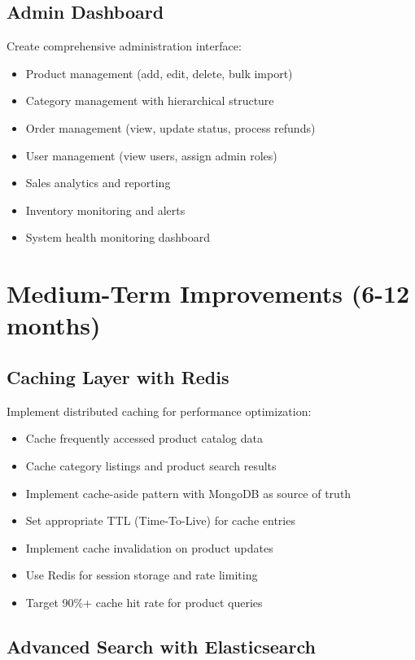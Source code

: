 \subsection{Admin Dashboard}

Create comprehensive administration interface:
\begin{itemize}
    \item Product management (add, edit, delete, bulk import)
    \item Category management with hierarchical structure
    \item Order management (view, update status, process refunds)
    \item User management (view users, assign admin roles)
    \item Sales analytics and reporting
    \item Inventory monitoring and alerts
    \item System health monitoring dashboard
\end{itemize}

\section{Medium-Term Improvements (6-12 months)}

\subsection{Caching Layer with Redis}

Implement distributed caching for performance optimization:
\begin{itemize}
    \item Cache frequently accessed product catalog data
    \item Cache category listings and product search results
    \item Implement cache-aside pattern with MongoDB as source of truth
    \item Set appropriate TTL (Time-To-Live) for cache entries
    \item Implement cache invalidation on product updates
    \item Use Redis for session storage and rate limiting
    \item Target 90\%+ cache hit rate for product queries
\end{itemize}

\subsection{Advanced Search with Elasticsearch}

